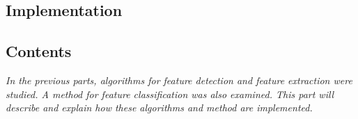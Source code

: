   \begin{titlepage}
    \vspace*{\fill}
      \part{Implementation}
    \vspace*{\fill}
  \end{titlepage}

\startcontents[parts]

\chapter*{Contents}

\textit{In the previous parts, algorithms for feature detection and feature extraction were studied. A method for feature classification was also examined. This part will describe and explain how these algorithms and method are implemented.} 

\vspace{\baselineskip}


\pagebreak

\clearpage
\newpage

\clearpage
\newpage

\clearpage
\newpage


\stopcontents[parts]
